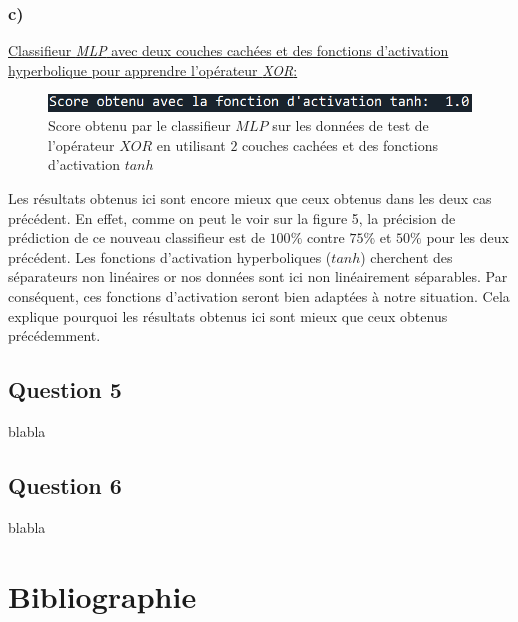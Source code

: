 \documentclass[frenchb]{report}
\newcommand{\1}{\mathbbm{1}}
\theoremstyle{definition}\newtheorem{defn}{Définition}
\theoremstyle{definition}\newtheorem{exm}{Exemple}
\theoremstyle{definition}\newtheorem{nota}{Notation}
\theoremstyle{definition}\newtheorem{rem}{Remarque}
\begin{document}
\subsection{c)}

\underline{Classifieur \textit{MLP} avec deux couches cachées et des fonctions d'activation hyperbolique pour apprendre l’opérateur \textit{XOR}:}

\begin{figure}[H]
	\centering
	\includegraphics[scale=0.7]{images/Q4c.png}
	\caption{Score obtenu par le classifieur $MLP$ sur les données de test de l'opérateur $XOR$ en utilisant $2$ couches cachées et des fonctions d'activation $tanh$}
\end{figure}
Les résultats obtenus ici sont encore mieux que ceux obtenus dans les deux cas précédent. En effet, comme on peut le voir sur la figure 5, la précision de prédiction de ce nouveau classifieur est de $100\%$ contre $75\%$ et $50\%$ pour les deux précédent.
Les fonctions d'activation hyperboliques ($tanh$) cherchent des séparateurs non linéaires or nos données sont ici non linéairement séparables. Par conséquent, ces fonctions d'activation seront bien adaptées à notre situation. Cela explique pourquoi les résultats obtenus ici sont mieux que ceux obtenus précédemment.

\section*{Question 5}


blabla

\section*{Question 6}


blabla

\chapter*{Bibliographie}

\end{document}
